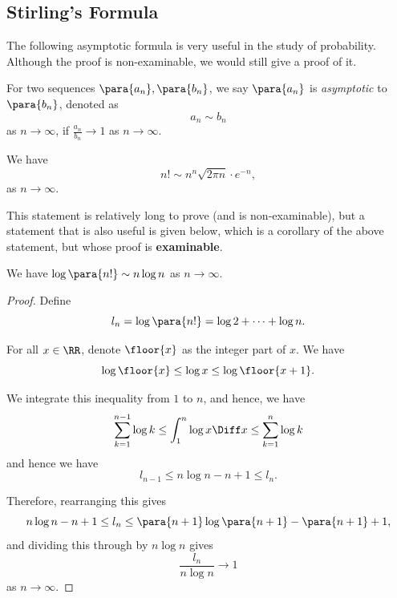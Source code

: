 \subsection{Stirling's Formula}

The following asymptotic formula is very useful in the study of probability. Although the proof is non-examinable, we would still give a proof of it.

\begin{definition}[Asymptotic]
    \label{def:asymptotic}%
    For two sequences \(\para{a_n}, \para{b_n}\), we say \(\para{a_n}\) is \emph{asymptotic} to \(\para{b_n}\), denoted as
    \[
        a_n \sim b_n
    \]
    as \(n \to \infty\), if \(\frac{a_n}{b_n} \to 1\) as \(n \to \infty\).
\end{definition}

\begin{theorem}
    \label{thm:stirling-formula}%
    We have
    \[
        n! \sim n^n \sqrt{2 \pi n} \cdot e^{-n},
    \]
    as \(n \to \infty\).
\end{theorem}

This statement is relatively long to prove (and is non-examinable), but a statement that is also useful is given below, which is a corollary of the above statement, but whose proof is \textbf{examinable}.

\begin{corollary}
    \label{cor:weaker-statement-of-stirling}%
    We have \(\log \para{n!} \sim n \log n\) as \(n \to \infty\).
\end{corollary}

\begin{proof}
    Define
    \[
        l_n = \log\para{n!} = \log 2 + \cdots + \log n.
    \]

    For all \(x \in \RR\), denote \(\floor{x}\) as the integer part of \(x\). We have
    \[
        \log \floor{x} \leq \log x \leq \log \floor{x + 1}.
    \]

    We integrate this inequality from \(1\) to \(n\), and hence, we have
    \[
        \sum_{k = 1}^{n - 1} \log k \leq \int_{1}^{n} \log x \Diff x \leq \sum_{k = 1}^{n} \log k
    \]
    and hence we have
    \[
        l_{n - 1} \leq n \log n - n + 1 \leq l_n.
    \]

    Therefore, rearranging this gives
    \[
        n \log n - n + 1 \leq l_n \leq \para{n + 1} \log \para{n + 1} - \para{n + 1} + 1,
    \]
    and dividing this through by \(n \log n\) gives
    \[
        \frac{l_n}{n \log n} \to 1
    \]
    as \(n \to \infty\).
\end{proof}

